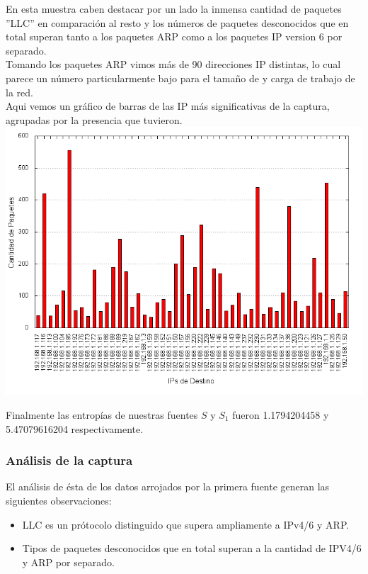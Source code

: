 En esta muestra caben destacar por un lado la inmensa cantidad de paquetes ''LLC'' en comparaci\'on al resto y los n\'umeros de paquetes desconocidos que en total superan tanto a los paquetes ARP como a los paquetes IP version 6 por separado. \\

Tomando los paquetes ARP vimos m\'as de 90 direcciones IP distintas, lo cual parece un n\'umero particularmente bajo para el tamaño de y carga de trabajo de la red.\\

Aqui vemos un gr\'afico de barras de las IP m\'as significativas de la captura, agrupadas por la presencia que tuvieron.  \\

\includegraphics[scale=0.7]{exp3-graficos/s1_oficina_is_pkg.png}

Finalmente las entrop\'ias de nuestras fuentes $S$ y $S_{1}$ fueron 1.1794204458 y 5.47079616204 respectivamente.\\



\subsubsection{An\'alisis de la captura}
El an\'alisis de \'esta de los datos arrojados por la primera fuente generan las siguientes observaciones:

\begin{itemize}
\item LLC es un pr\'otocolo distinguido que supera ampliamente a IPv4/6 y ARP.
\item Tipos de paquetes desconocidos que en total superan a la cantidad de IPV4/6 y ARP por separado.
\end{itemize}

